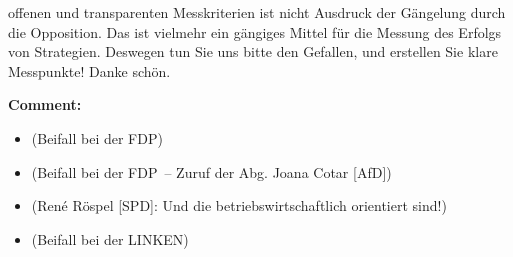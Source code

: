 \documentclass{article}
\begin{document}
offenen und transparenten Messkriterien ist nicht Ausdruck der Gängelung durch die Opposition. Das ist vielmehr ein gängiges Mittel für die Messung des Erfolgs von Strategien. Deswegen tun Sie uns bitte den Gefallen, und erstellen Sie klare Messpunkte! Danke schön.  

\noindent\textbf{Comment:}
\begin{itemize}
    \setlength\itemsep{-3pt}
    \item (Beifall bei der FDP)
    \setlength\itemsep{-3pt}
    \item (Beifall bei der FDP – Zuruf der Abg. Joana Cotar [AfD])
    \setlength\itemsep{-3pt}
    \item (René Röspel [SPD]: Und die betriebswirtschaftlich orientiert sind!)
    \setlength\itemsep{-3pt}
    \item (Beifall bei der LINKEN)
\end{itemize}
\end{document}
